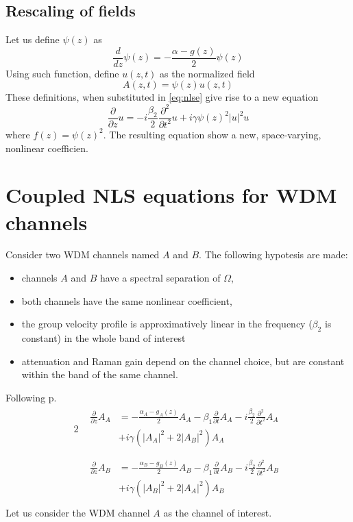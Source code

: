 \documentclass[10pt,journal]{IEEEtran}
\begin{document}
\subsection{Rescaling of fields}

Let us define $\psi(z)$ as
\begin{equation}
 \frac{d}{dz}\psi(z) = -\frac{\alpha-g(z)}{2} \psi(z)
\end{equation}
Using such function, define $u(z, t)$ as the normalized field
\begin{equation}
 A(z, t) = \psi(z)u(z, t)
\end{equation}
These definitions, when substituted in \ref{eq:nlse} give rise to a new equation
\begin{equation}
 \frac{\partial}{\partial z} u = - i \frac{\beta_2}{2} \frac{\partial^2}{\partial t^2} u + i \gamma \psi(z)^2 |u|^2 u
\end{equation}
where $f(z) = \psi(z)^2$. The resulting equation show a new, space-varying, nonlinear coefficien.
\section{Coupled NLS equations for WDM channels}
Consider two WDM channels named $A$ and $B$.
The following hypotesis are made:
\begin{itemize}
 \item channels $A$ and $B$ have a spectral separation of $\Omega$,
 \item both channels have the same nonlinear coefficient,
 \item the group velocity profile is approximatively linear in the frequency ($\beta_2$ is constant) in the whole band of interest
 \item attenuation and Raman gain depend on the channel choice, but are constant within the band of the same channel.
\end{itemize}
Following \cite{Agrawal} p.
\begin{alignat}{2}
    &\begin{aligned}
        \frac{\partial}{\partial z} A_A &= -\frac{\alpha_A - g_A(z)}{2}A_A - \beta_1 \frac{\partial}{\partial t} A_A -  i \frac{\beta_2}{2} \frac{\partial^2}{\partial t^2} A_A \\ &+ i \gamma (|A_A|^2 +2 |A_B|^2)A_A \\
    \end{aligned}\label{eq:nlA} \\
    &\begin{aligned}
        \frac{\partial}{\partial z} A_B &= -\frac{\alpha_B - g_B(z)}{2}A_B - \beta_1 \frac{\partial}{\partial t} A_B - i \frac{\beta_2}{2} \frac{\partial^2}{\partial t^2} A_B \\ &+ i \gamma (|A_B|^2 +2 |A_A|^2)A_B \\
    \end{aligned}\label{eq:nlB}
\end{alignat}
Let us consider the WDM channel $A$ as the channel of interest.
\end{document}
